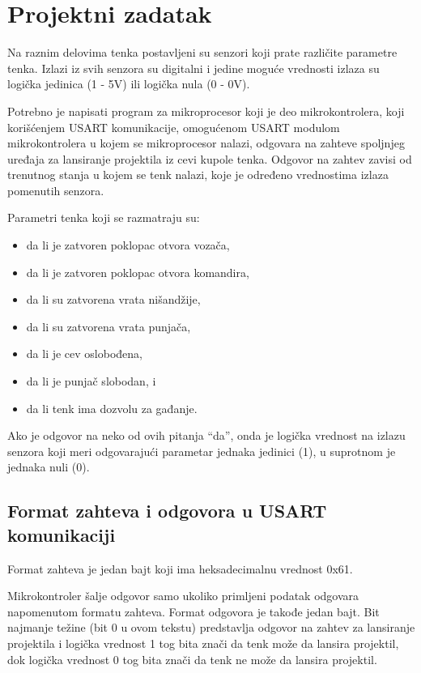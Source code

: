 \documentclass[a4paper, 12pt, oneside, titlepage]{article}
\begin{document}
    \section {Projektni zadatak}
    Na raznim delovima tenka postavljeni su senzori koji prate različite parametre tenka. Izlazi iz svih senzora su
    digitalni i jedine moguće vrednosti izlaza su logička jedinica (1 - 5V) ili logička nula (0 - 0V).
    
    Potrebno je napisati program za mikroprocesor koji je deo mikrokontrolera, koji korišćenjem USART komunikacije,
    omogućenom USART modulom mikrokontrolera u kojem se mikroprocesor nalazi, odgovara na zahteve spoljnjeg uređaja
    za lansiranje projektila iz cevi kupole tenka. Odgovor na zahtev zavisi od trenutnog stanja u kojem se tenk nalazi,
    koje je određeno vrednostima izlaza pomenutih senzora.
    
    Parametri tenka koji se razmatraju su:
    \begin{itemize}
      \item da li je zatvoren poklopac otvora vozača,
      \item da li je zatvoren poklopac otvora komandira,
      \item da li su zatvorena vrata nišandžije,
      \item da li su zatvorena vrata punjača,
      \item da li je cev oslobođena,
      \item da li je punjač slobodan, i
      \item da li tenk ima dozvolu za gađanje.
    \end{itemize}
    
    Ako je odgovor na neko od ovih pitanja ``da'', onda je logička vrednost na izlazu senzora koji meri odgovarajući
    parametar jednaka jedinici (1), u suprotnom je jednaka nuli (0).
    
      \subsection{Format zahteva i odgovora u USART komunikaciji}
      Format zahteva je jedan bajt koji ima heksadecimalnu vrednost 0x61.
      
      Mikrokontroler šalje odgovor samo ukoliko primljeni podatak odgovara napomenutom formatu zahteva. Format odgovora
      je takođe jedan bajt. Bit najmanje težine (bit 0 u ovom tekstu) predstavlja odgovor na zahtev za lansiranje
      projektila i logička vrednost 1 tog bita znači da tenk može da lansira projektil, dok logička vrednost 0 tog bita
      znači da tenk ne može da lansira projektil.
      
\end{document}
